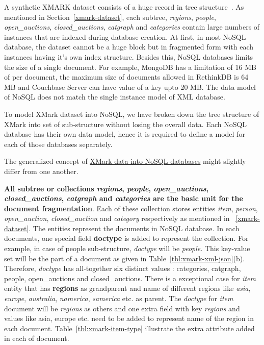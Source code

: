 A synthetic XMARK dataset consists of a huge record in tree structure~\citep{xmark/VIST}. As mentioned in Section~\ref{xmark-dataset}, each subtree, \textit{regions}, \textit{people}, \textit{open\_auctions}, \textit{closed\_auctions}, \textit{catgraph} and \textit{categories} contain large numbers of instances that are indexed during database creation. At first, in most NoSQL database, the dataset cannot be a huge block but in fragmented form with each instances having it's own index structure. Besides this, NoSQL databases limits the size of a single document. For example, MongoDB has a limitation of 16 MB of per document, the maximum size of documents allowed in RethinkDB is 64 MB and Couchbase Server can have value of a key upto 20 MB. The data model of NoSQL does not match the single instance model of XML database.
\par 
To model XMark dataset into NoSQL, we have broken down the tree structure of XMark  into set of sub-structure without losing the overall data. Each NoSQL database has their own data model, hence it is required to define a model for each of those databases separately.

The generalized concept of \underline {XMark data into NoSQL databases} might slightly differ from one another. 

\textbf{All subtree or collections \textit{regions}, \textit{people}, \textit{open\_auctions}, \textit{closed\_auctions}, \textit{catgraph} and \textit{categories} are the basic unit for the document fragmentation}. Each of these collection stores entities \textit{item}, \textit{person}, \textit{open\_auction}, \textit{closed\_auction} and \textit{category} respectively as mentioned in ~\ref{xmark-dataset}. The entities represent the documents in NoSQL database. In each documents, one special field \textbf{doctype} is added to represent the collection. For example, in case of people sub-structure, \textit{doctype} will be \textit{people}. This key-value set will be the part of a document as  given in Table~\ref{tbl:xmark-xml-json}(b). Therefore, \textit{doctype} has all-together six distinct values : categories, catgraph, people, open\_auctions and closed\_auctions. There is a exceptional case for \textit{item} entity  that has \textbf{regions} as grandparent and name of different regions like \textit{asia}, \textit{europe}, \textit{australia}, \textit{namerica}, \textit{samerica} etc. as parent.  The \textit{doctype} for \textit{item} document will be \textit{regions} as others and one extra field with key \textit{regions} and values like asia, europe etc. need to be added to represent name of the region in each document. Table~\ref{tbl:xmark-item-type} illustrate the extra attribute added in each of document.

